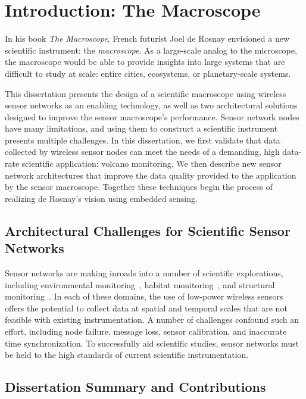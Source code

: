 \chapter{Introduction: The Macroscope} 
\label{chap-introduction}

In his book \textit{The Macroscope}, French futurist Joel de Rosnay
envisioned a new scientific instrument: the \textit{macroscope}. As a
large-scale analog to the microscope, the macroscope would be able to provide
insights into large systems that are difficult to study at scale: entire
cities, ecosystems, or planetary-scale systems.

This dissertation presents the design of a scientific macroscope using
wireless sensor networks as an enabling technology, as well as two
architectural solutions designed to improve the sensor macroscope's
performance. Sensor network nodes have many limitations, and using them to
construct a scientific instrument presents multiple challenges. In this
dissertation, we first validate that data collected by wireless sensor nodes
can meet the needs of a demanding, high data-rate scientific application:
volcano monitoring. We then describe new sensor network architectures that
improve the data quality provided to the application by the sensor
macroscope. Together these techniques begin the process of realizing de
Rosnay's vision using embedded sensing.

\section{Architectural Challenges for Scientific Sensor Networks}

Sensor networks are making inroads into a number of scientific explorations,
including environmental monitoring~\cite{rope-emnets05,berkeley-redwoods},
habitat monitoring~\cite{cerpa-habitat,mainwaring-habitat,gdi-sensys04}, and
structural monitoring~\cite{ggb-monitoring,netshm-emnets05,wisan}. In each of
these domains, the use of low-power wireless sensors offers the potential to
collect data at spatial and temporal scales that are not feasible with
existing instrumentation. A number of challenges confound such an effort,
including node failure, message loss, sensor calibration, and inaccurate time
synchronization. To successfully aid scientific studies, sensor networks must
be held to the high standards of current scientific instrumentation.


\section{Dissertation Summary and Contributions}

